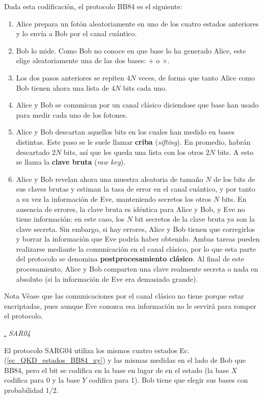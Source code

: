 \documentclass[a4paper,11pt]{book} %
\numberwithin{equation}{chapter}
\def\subsubiContadorIt{\par\addtocounter{subsubsection}{1}\underline{\it\thesubsubsection.}\hskip0.5cm \setcounter{subsubsubsectionIt}{0}}
\newcommand{\SubsubiIt}[1]{
		\subsubiContadorIt \textit{#1}
	}
\newcounter{subsubsubsectionIt}[subsubsection]
\begin{document}
Dada esta codificación, el protocolo BB84 es el siguiente:
\begin{enumerate}
	\item Alice prepara un fotón aleatoriamente en uno de los cuatro estados anteriores y lo envía a Bob por el canal cuántico. 
	\item Bob lo mide. Como Bob no conoce en que base lo ha generado Alice, este elige aleatoriamente una de las dos bases: $+$ o $\times$. 
	\item Los dos pasos anteriores se repiten $4N$ veces, de forma que tanto Alice como Bob tienen ahora una lista de $4N$ bits cada uno.
	\item Alice y Bob se comunican por un canal clásico diciendose que base han usado para medir cada uno de los fotones.
	\item Alice y Bob descartan aquellos bits en los cuales han medido en bases distintas. Este paso se le suele llamar \textbf{criba} (\textit{sifting}).  En promedio, habrán descartado $2N$ bits, así que les queda una lista con los otros $2N$ bits. A esto se llama la \textbf{clave bruta} (\textit{raw key}).
	\item  Alice y Bob revelan ahora una muestra aleatoria de tamaño $N$ de los bits de sus claves brutas y estiman la tasa de error en el canal cuántico, y por tanto a su vez la información de Eve, manteniendo secretos los otros $N$ bits. En ausencia de errores, la clave bruta es idéntica para Alice y Bob, y Eve no tiene información: en este caso, los $N$ bit secretos de la clave bruta ya son la clave secreta. Sin embargo, si hay errores, Alice y Bob tienen que corregirlos y borrar la información que Eve podría haber obtenido. Ambas tareas pueden realizarse mediante la comunicación en el canal clásico, por lo que esta parte del protocolo se denomina \textbf{postprocesamiento clásico}. Al final de este procesamiento, Alice y Bob comparten una clave realmente secreta o nada en absoluto (si la información de Eve era demasiado grande).
\end{enumerate}


	\begin{mybox_blue}{Nota}
	Véase que las comunicaciones por el canal clásico no tiene porque estar encriptadas, pues aunque Eve conozca esa información no le servirá para romper el protocolo.
	\end{mybox_blue}


			\SubsubiIt{SAR04}

El protocolo SARG04 \cite{SAR04_1,SAR04_2} utiliza los mismos cuatro estados Ec. (\ref{ec_QKD_estados_BB84_xy}) y las mismas medidas en el lado de Bob que BB84, pero el bit se codifica en la base en lugar de en el estado (la base $X$ codifica para 0 y la base $Y$ codifica para 1). Bob tiene que elegir sus bases con probabilidad 1/2. 
\end{document}
